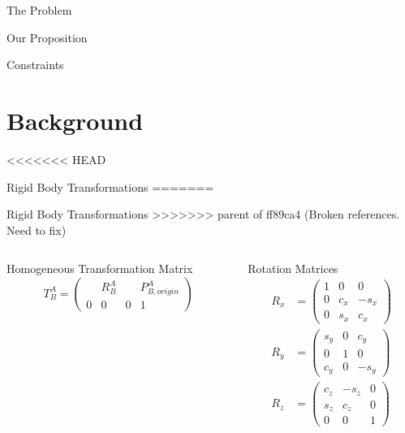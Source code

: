 \documentclass[presentation, aspectratio=1610]{beamer}
\begin{document}
\begin{frame}[label={sec:org51bdd62}]{The Problem}
\begin{frame}[label={sec:org827823c}]{Our Proposition}
\begin{frame}[label={sec:org8655799}]{Constraints}
\section{Background}
<<<<<<< HEAD
\label{sec:orga141b40}
\begin{frame}[label={sec:orgb624cd0}]{Rigid Body Transformations}
=======
\label{sec:orgad67985}
\begin{frame}[label={sec:orgbb766fd}]{Rigid Body Transformations}
>>>>>>> parent of ff89ca4 (Broken references. Need to fix)
\begin{columns}
\begin{column}{0.5\columnwidth}
\begin{block}{Homogeneous Transformation Matrix}
\begin{equation*}
  T^{A}_{B} =
  \begin{pmatrix}
    & R^{A}_{B} & & P^{A}_{B,origin} \\
    0 & 0 & 0 & 1
  \end{pmatrix}
\end{equation*}
\end{block}
\end{column}

\begin{column}{0.5\columnwidth}
\begin{block}{Rotation Matrices}
\begin{equation*}
  \begin{aligned}
    R_{x} & =
            \begin{pmatrix}
              1 & 0 & 0 \\
              0 & c_{x} & -s_{x}\\
              0 & s_{x} & c_{x}
            \end{pmatrix} \\
    R_{y} &=
            \begin{pmatrix}
              s_{y} & 0 & c_{y}\\
              0 & 1 & 0 \\
              c_{y} & 0 & -s_{y}
            \end{pmatrix} \\
    R_{z} &=
            \begin{pmatrix}
              c_{z} & -s_{z} & 0 \\
              s_{z} & c_{z} & 0 \\
              0 & 0 & 1
            \end{pmatrix}
  \end{aligned}
\end{equation*}
\end{block}
\end{column}
\end{columns}
\end{frame}


\end{frame}
\end{frame}
\end{frame}
\end{frame}
\end{document}

